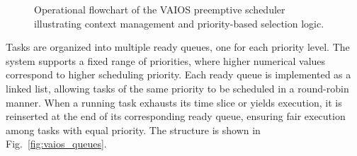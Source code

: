 \begin{figure}[H]
    \caption{Operational flowchart of the VAIOS preemptive scheduler illustrating context management and priority-based selection logic.}
    \label{fig:vaios_scheduler_flow}
\end{figure}

Tasks are organized into multiple ready queues, one for each priority level. The system supports a fixed range of priorities, where higher numerical values correspond to higher scheduling priority. Each ready queue is implemented as a linked list, allowing tasks of the same priority to be scheduled in a round-robin manner. When a running task exhausts its time slice or yields execution, it is reinserted at the end of its corresponding ready queue, ensuring fair execution among tasks with equal priority. The structure is shown in Fig.~\ref{fig:vaios_queues}.

